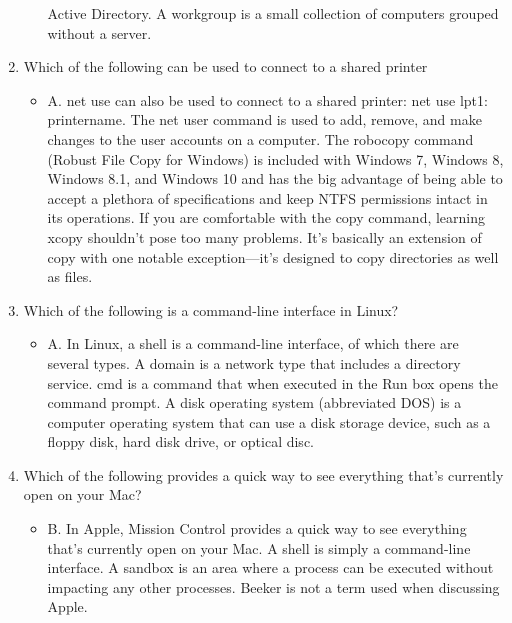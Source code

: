 \documentclass{article}
\begin{document}
\begin{enumerate}
\begin{itemize}
Active Directory. A workgroup is a small collection of computers grouped without a server.
    \end{itemize}
    \item Which of the following can be used to connect to a shared printer
    \begin{itemize}
        \item  A. net use can also be used to connect to a shared printer: net use lpt1: \\printername.
The net user command is used to add, remove, and make changes to the user accounts
on a computer. The robocopy command (Robust File Copy for Windows) is included with
Windows 7, Windows 8, Windows 8.1, and Windows 10 and has the big advantage of
being able to accept a plethora of specifications and keep NTFS permissions intact in its
operations. If you are comfortable with the copy command, learning xcopy shouldn’t pose
too many problems. It’s basically an extension of copy with one notable exception—it’s
designed to copy directories as well as files.
    \end{itemize}
    \item Which of the following is a command-line interface in Linux?
    \begin{itemize}
        \item A. In Linux, a shell is a command-line interface, of which there are several types. A
domain is a network type that includes a directory service. cmd is a command that when
executed in the Run box opens the command prompt. A disk operating system (abbreviated
DOS) is a computer operating system that can use a disk storage device, such as a floppy
disk, hard disk drive, or optical disc.
    \end{itemize}
    \item Which of the following provides a quick way to see everything that’s currently open on
your Mac?
    \begin{itemize}
        \item B. In Apple, Mission Control provides a quick way to see everything that’s currently open
on your Mac. A shell is simply a command-line interface. A sandbox is an area where a
process can be executed without impacting any other processes. Beeker is not a term used
when discussing Apple.
    \end{itemize}
\end{enumerate}
\end{document}
